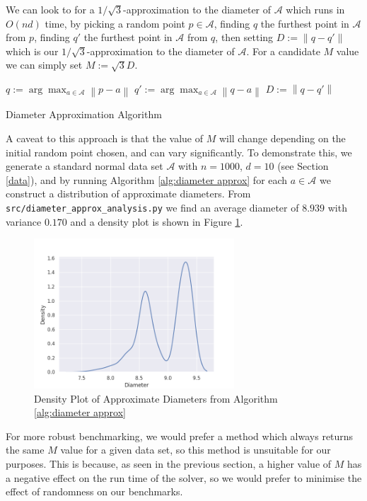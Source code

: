 \documentclass[11pt,twoside]{report}
\newcommand{\A}{\mathcal{A}} %
\newcommand{\norm}[1]{\left\lVert#1\right\rVert} %
\theoremstyle{definition}
\numberwithin{theorem}{section}
\numberwithin{definition}{section}
\numberwithin{lemma}{section}
\numberwithin{proposition}{section}
\numberwithin{equation}{section}
\numberwithin{figure}{section}
\begin{document}
We can look to \cite[Lemma 1]{core-sets} for a $1/\sqrt{3}$-approximation to the diameter of $\A$ which runs in $O(nd)$ time, by picking a random point $p\in\A$, finding $q$ the furthest point in $\A$ from $p$, finding $q'$ the furthest point in $\A$ from $q$, then setting $D:=\norm{q-q'}$ which is our $1/\sqrt{3}$-approximation to the diameter of $\A$. For a candidate $M$ value we can simply set $M:=\sqrt{3}D$.

\begin{algorithm}[H]\label{alg:diameter approx}
    \KwIn{Data set $\A$, point $p\in\A$}
    $q:=\arg\max_{a\in\A}\norm{p-a}$\;
    $q':=\arg\max_{a\in\A}\norm{q-a}$\;
    $D:=\norm{q-q'}$\;
    \;
    
    \caption{Diameter Approximation Algorithm \cite[Lemma 1]{core-sets}}
\end{algorithm}
A caveat to this approach is that the value of $M$ will change depending on the initial random point chosen, and can vary significantly. To demonstrate this, we generate a standard normal data set $\A$ with $n=1000$, $d=10$ (see Section \ref{data}), and by running Algorithm \ref{alg:diameter approx} for each $a\in\A$ we construct a distribution of approximate diameters. From \texttt{src/diameter\_approx\_analysis.py} we find an average diameter of $8.939$ with variance $0.170$ and a density plot is shown in Figure \ref{fig:diameter approx density}.

\begin{figure}
    \centering
    \includegraphics[width=0.6666\textwidth]{pw_M_density.png}
    \caption{Density Plot of Approximate Diameters from Algorithm \ref{alg:diameter approx}}
    \label{fig:diameter approx density}
\end{figure}

For more robust benchmarking, we would prefer a method which always returns the same $M$ value for a given data set, so this method is unsuitable for our purposes. This is because, as seen in the previous section, a higher value of $M$ has a negative effect on the run time of the solver, so we would prefer to minimise the effect of randomness on our benchmarks.
\end{document}
